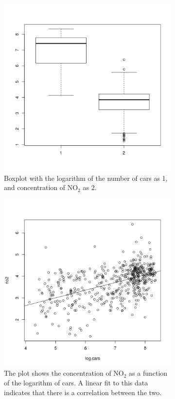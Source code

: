 \documentclass[a4paper]{article}
\begin{document}
\begin{figure}
\begin{subfigure}{.5\textwidth}
 \includegraphics[width=\textwidth]{boxno2logcars.png}
 \caption{Boxplot with the logarithm of the number of cars as 1, and concentration of NO$_2$ as 2.}
 \label{boxno2logcars}
 \end{subfigure}
 \begin{subfigure}{.5\textwidth}
  \includegraphics[width=\textwidth]{no2_v_logcars.png}
 \caption{The plot shows the concentration of NO$_2$ as a function of the logarithm of cars. A linear fit to this data indicates that there is a correlation between the two.}
 \label{no2cars}
 \end{subfigure}
 \caption{}
 \end{figure}  
\end{document}
